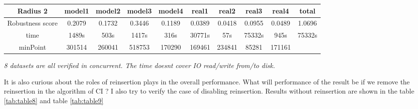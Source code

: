 \documentclass{article}
\begin{document}
\begin{table}[!htbp]
\begin{adjustwidth}{-1cm}{}
\begin{threeparttable}
\begin{tabular}{|c|c|c|c|c|c|c|c|c|c|}
				\textbf{Radius 2} & \textbf{model1} & \textbf{model2} & \textbf{model3} & \textbf{model4} & \textbf{real1} & \textbf{real2} & \textbf{real3} & \textbf{real4} & \textbf{total} \\ \hline
				Robustness score                 & 0.2079&0.1732&0.3446&0.1189&0.0389&0.0418&0.0955&0.0489&1.0696         \\ \hline
				time                             &  1489s&503s&1417s&316s&30771s&57s&75332s&945s&75332s
				         \\ \hline
				minPoint                         & 301514&260041&518753&170290&169461&234841&85281&171161
				     &                \\ \hline				
			\end{tabular}
			\begin{tablenotes}
				\small
				\item\textit{ 8 datasets are all verified in concurrent. The time doesn\textquotesingle t cover IO read/write from/to disk.}
			\end{tablenotes}			
		\end{threeparttable}
		\end{adjustwidth}	
	\end{table}	
	
	It is also curious about the roles of reinsertion plays in the overall performance. What will performance of the result be if we remove the reinsertion in the algorithm of CI ? I also try to verify the case of disabling reinsertion. Results without reinsertion are shown in the table \ref{tab:table8} and table \ref{tab:table9} 
	
\end{document}
